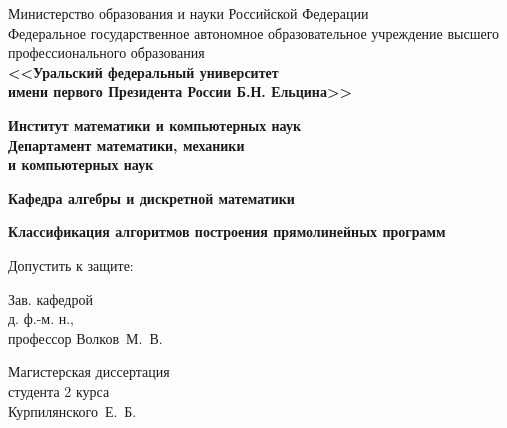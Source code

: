 \documentclass[14pt]{article}
\renewcommand{\scriptsize}{\fontsize{8}{11pt}\selectfont}
\renewcommand{\small}{\fontsize{12}{14.5pt}\selectfont}
\renewcommand{\normalsize}{\fontsize{14}{18pt}\selectfont}
\renewcommand{\Large}{\fontsize{20}{25pt}\selectfont}
\begin{document}

{
\thispagestyle{empty}
\begin{singlespace}

\begin{center}
\scriptsize Министерство образования и науки Российской Федерации\\
\scriptsize Федеральное государственное автономное образовательное учреждение высшего профессионального образования\\
\small\bf <<Уральский федеральный университет\\
\small\bf имени первого Президента России Б.Н. Ельцина>>
\end{center}

\begin{center}
\normalsize\bf Институт математики и компьютерных наук\\
\normalsize\bf Департамент математики, механики\\
\normalsize\bf и компьютерных наук
\end{center}
\begin{center}
\normalsize\bf Кафедра алгебры и дискретной математики\\
\end{center}

\vspace{3cm}

\begin{center}
\Large\bf Классификация алгоритмов построения прямолинейных программ
\end{center}

\vspace{3.5cm}

\hspace{-1cm}
\begin{minipage}{80mm}
 \noindent
 \vspace{-2.3cm}
	\begin{flushleft}
		\normalsize Допустить к защите:\\
	\end{flushleft}
	
	\begin{flushleft}
		\normalsize Зав. кафедрой\\
		\normalsize д. ф.-м. н.,\\
		\normalsize профессор Волков~М.~В.
	\end{flushleft}
\end{minipage}
\begin{minipage}{85mm}
	\begin{flushright}
		\normalsize Магистерская диссертация\\
		\normalsize студента 2 курса\\
		\normalsize Курпилянского~Е.~Б.
	\end{flushright}
	

\end{minipage}
\end{singlespace}}
\end{document}
